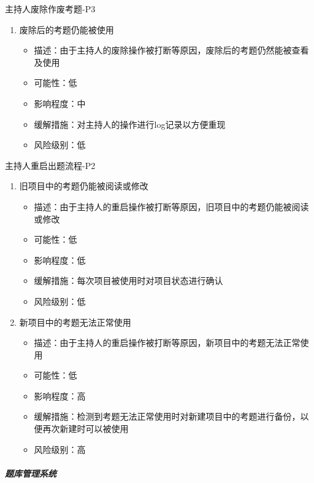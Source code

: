 \documentclass[hyperref, a4paper]{ctexart}
\providecommand{\tightlist}{%
  \setlength{\itemsep}{0pt}\setlength{\parskip}{0pt}}
\let\oldsubparagraph\subparagraph
\renewcommand{\subparagraph}[1]{\oldsubparagraph{#1}\mbox{}}
\begin{document}
主持人废除作废考题-P3

\begin{enumerate}
\def\labelenumi{\arabic{enumi}.}
\tightlist
\item
  废除后的考题仍能被使用

  \begin{itemize}
  \tightlist
  \item
    描述：由于主持人的废除操作被打断等原因，废除后的考题仍然能被查看及使用
  \item
    可能性：低
  \item
    影响程度：中
  \item
    缓解措施：对主持人的操作进行log记录以方便重现
  \item
    风险级别：低
  \end{itemize}
\end{enumerate}

主持人重启出题流程-P2

\begin{enumerate}
\def\labelenumi{\arabic{enumi}.}
\tightlist
\item
  旧项目中的考题仍能被阅读或修改

  \begin{itemize}
  \tightlist
  \item
    描述：由于主持人的重启操作被打断等原因，旧项目中的考题仍能被阅读或修改
  \item
    可能性：低
  \item
    影响程度：低
  \item
    缓解措施：每次项目被使用时对项目状态进行确认
  \item
    风险级别：低
  \end{itemize}
\item
  新项目中的考题无法正常使用

  \begin{itemize}
  \tightlist
  \item
    描述：由于主持人的重启操作被打断等原因，新项目中的考题无法正常使用
  \item
    可能性：低
  \item
    影响程度：高
  \item
    缓解措施：检测到考题无法正常使用时对新建项目中的考题进行备份，以便再次新建时可以被使用
  \item
    风险级别：高
  \end{itemize}
\end{enumerate}

\hypertarget{ux9898ux5e93ux7ba1ux7406ux7cfbux7edf-2}{%
\subparagraph{题库管理系统}\label{ux9898ux5e93ux7ba1ux7406ux7cfbux7edf-2}}
\end{document}
